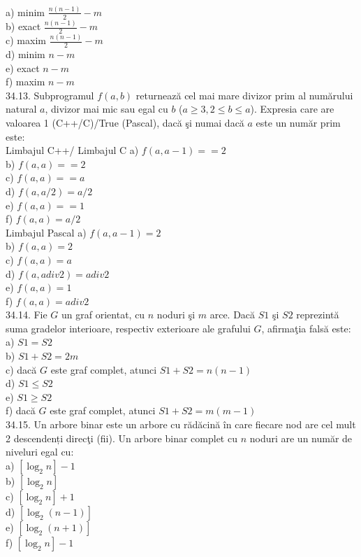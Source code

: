\begin{itemize}
\begin{enumerate}
\\
a) minim $\frac{n(n-1)}{2}-m$
\\
b) exact $\frac{n(n-1)}{2}-m$
\\
c) maxim $\frac{n(n-1)}{2}-m$
\\
d) minim $n-m$
\\
e) exact $n-m$
\\
f) maxim $n-m$
\\
34.13. Subprogramul $f(a, b)$ returnează cel mai mare divizor prim al numărului natural $a$, divizor mai mic sau egal cu $b$ ($a \geq 3,2 \leq b \leq a$). Expresia care are valoarea 1 (C++/C)/True (Pascal), dacă şi numai dacă $a$ este un număr prim este:
\\
Limbajul C++/ Limbajul C
a) $f(a, a-1)==2$
\\
b) $f(a, a)==2$
\\
c) $f(a, a)==a$
\\
d) $f(a, a / 2)=a / 2$
\\
e) $f(a, a)==1$
\\
f) $f(a, a)=a / 2$
\\
Limbajul Pascal
a) $f(a, a-1)=2$
\\
b) $f(a, a)=2$
\\
c) $f(a, a)=a$
\\
d) $f(a, a div 2)=a div 2$
\\
e) $f(a, a)=1$
\\
f) $f(a, a)=a div 2$
\\
34.14. Fie $G$ un graf orientat, cu $n$ noduri şi $m$ arce. Dacă $S1$ şi $S2$ reprezintă suma gradelor interioare, respectiv exterioare ale grafului $G$, afirmaţia falsă este:
\\
a) $S1=S2$
\\
b) $S1+S2=2 m$
\\
c) dacă $G$ este graf complet, atunci $S1+S2=n(n-1)$
\\
d) $S1 \leq S2$
\\
e) $S1 \geq S2$
\\
f) dacă $G$ este graf complet, atunci $S1+S2=m(m-1)$
\\
34.15. Un arbore binar este un arbore cu rădăcină în care fiecare nod are cel mult 2 descendenți direcţi (fii). Un arbore binar complet cu $n$ noduri are un număr de niveluri egal cu:
\\
a) $[\log _{2} n]-1$
\\
b) $[\log _{2} n]$
\\
c) $[\log _{2} n]+1$
\\
d) $[\log _{2}(n-1)]$
\\
e) $[\log _{2}(n+1)]$
\\
f) $[\log _{2} n]-1$
\\


\end{enumerate}
\end{itemize}
